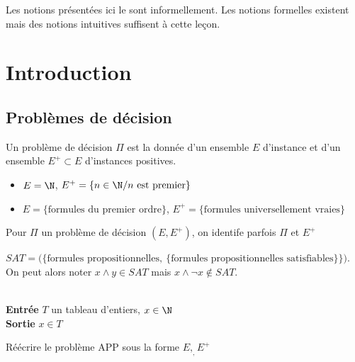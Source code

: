 
Les notions présentées ici le sont informellement. Les notions formelles existent mais des notions intuitives suffisent à cette leçon.

\section{Introduction}

\subsection{Problèmes de décision}

\begin{definition}
	Un problème de décision $\Pi$ est la donnée d'un ensemble $E$ d'instance et d'un ensemble $E^+\subset E$ d'instances positives.
\end{definition}

\begin{example}
	\begin{itemize}[label=$\bullet$]
		\item $E = \N$, $E^+ = \{n \in \N / n \text{ est premier}\}$
		\item $E = \{\text{formules du premier ordre}\}$, $E^+ =\{\text{formules universellement vraies}\}$
	\end{itemize}
\end{example}

\begin{personalise}[notation]
	Pour $\Pi$ un problème de décision $(E, E^+)$, on identife parfois $\Pi$ et $E^+$
\end{personalise}

\begin{example}
	$SAT = \Big( \{\text{formules propositionnelles}, \: \{\text{formules propositionnelles satisfiables}\}\}\Big)$. On peut alors noter $x\wedge y \in SAT$ mais $x\wedge \neg x\notin SAT$.
\end{example}

\begin{example}\\
	\label{31-app}
	\textbf{Entrée} $T$ un tableau d'entiers, $x \in \N$\\
	\textbf{Sortie} $x \in T$
\end{example}

\begin{exercise}
	Réécrire le problème APP sous la forme $E,_, E^+$
\end{exercise}

